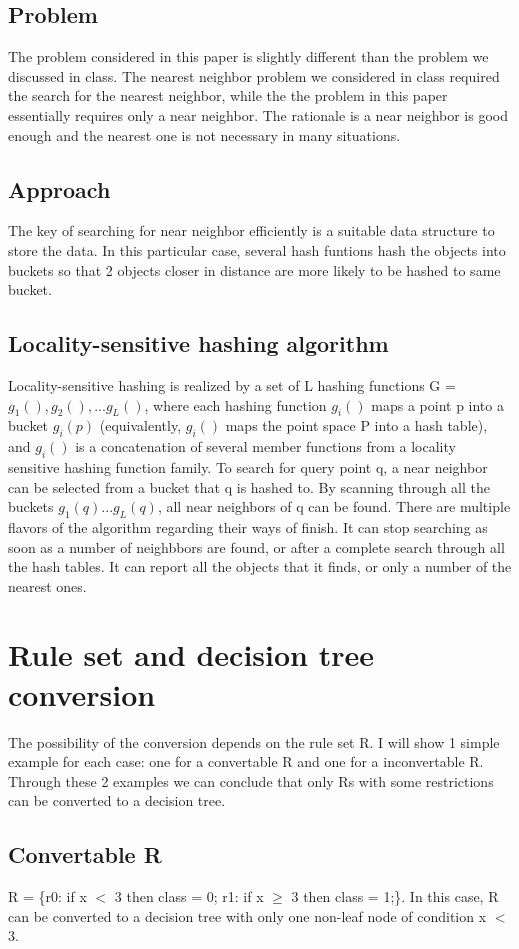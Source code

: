 \documentclass[12pt]{article}
\begin{document}
\subsection{Problem}
The problem considered in this paper is slightly different than the problem we discussed in class. The nearest neighbor problem we considered in class required the search for the nearest neighbor, while the the problem in this paper essentially requires only a near neighbor. The rationale is a near neighbor is good enough and the nearest one is not necessary in many situations.
\subsection{Approach}
The key of searching for near neighbor efficiently is a suitable data structure to store the data. In this particular case, several hash funtions hash the objects into buckets so that 2 objects closer in distance are more likely to be hashed to same bucket. 
\subsection{Locality-sensitive hashing algorithm}
Locality-sensitive hashing is realized by a set of L hashing functions G = {$g_1(), g_2(),...g_L()$}, where each hashing function $g_i()$ maps a point p into a bucket $g_i(p)$ (equivalently, $g_i()$ maps the point space P into a hash table), and $g_i()$ is a concatenation of several member functions from a locality sensitive hashing function family. To search for query point q, a near neighbor can be selected from a bucket that q is hashed to. By scanning through all the buckets $g_1(q)...g_L(q)$, all near neighbors of q can be found. There are multiple flavors of the algorithm regarding their ways of finish. It can stop searching as soon as a number of neighbbors are found, or after a complete search through all the hash tables. It can report all the objects that it finds, or only a number of the nearest ones.
\section{Rule set and decision tree conversion}
The possibility of the conversion depends on the rule set R. I will show 1 simple example for each case: one for a convertable R and one for a inconvertable R. Through these 2 examples we can conclude that only Rs with some restrictions can be converted to a decision tree.
\subsection{Convertable R}
R = \{r0: if x $<$ 3 then class = 0; r1: if x $\geq$ 3 then class = 1;\}. In this case, R can be converted to a decision tree with only one non-leaf node of condition x $<$ 3.
\end{document}
